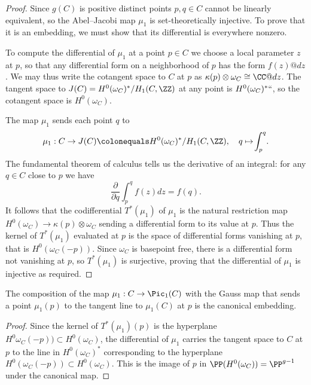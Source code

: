 \begin{proof}
Since $g(C)$
is positive
distinct points $p, q \in C$ cannot be linearly equivalent, so the
Abel--Jacobi map $\mu_1$ is set-theoretically
injective. To prove that it is an embedding, we must show
that its differential is
everywhere nonzero.

To compute the differential of $\mu_1$ at a point $p\in C$ we choose a
local parameter $z$ at $p$, so that any differential form on a
neighborhood of $p$ has the form $f(z)@dz$. We may thus write the
cotangent space to $C$ at $p$ as
$\kappa(p) \otimes \omega_{C} \cong \CC@dz$. The tangent space to
$J(C) = H^0(\omega_C)^*/H_1(C, \ZZ)$ at any point is
$H^0(\omega_C)^*` `$, so the
%
cotangent space
is $H^0(\omega_C)$.

The map $\mu_{1}$ sends each point $q$ to
\vspace*{-2pt}
$$
\mu_1 : C \to J(C) \colonequals H^0(\omega_C)^*/H_1(C, \ZZ),
\quad q \mapsto \!\int_p^q \!.
\vspace*{-2pt}
$$
The
%
fundamental theorem of calculus
tells us the derivative of an integral:
for any $q\in C$ close to $p$ we have
$$
\frac{\partial}{\partial q} \int_p^q \!f(z)dz = f(q).
$$
It follows that
the
%
codifferential
$T^*(\mu_1)$ of $\mu_1$ is the natural restriction map $H^0(\omega_{C}) \to \kappa(p) \otimes \omega_{C}$ sending
a differential form to its value at $p$. Thus the kernel of $T^*(\mu_1)$ evaluated at $p$ is the space of differential forms vanishing
at $p$, that is
$H^{0}(\omega_{C}(-p))$. Since $\omega_{C}$ is basepoint free, there is a differential form not vanishing at $p$,
so  $T^*(\mu_1)$ is surjective, proving that
the differential of $\mu_{1}$ is injective as required.
\end{proof}

\begin{corollary}
The composition of the map $\mu_{1}: C \to \Pic_{1}(C)$ with the
Gauss map
%
that sends a point $\mu_{1}(p)$
to the tangent line to $\mu_{1}(C)$ at $p$ is the
canonical embedding.
%
\unif
\end{corollary}

\begin{proof}
Since
the kernel of $T^*(\mu_1)(p)$ is  the hyperplane $H^{0}\omega_{C}(-p))\subset H^{0}(\omega_{C})$, the differential
of $\mu_{1}$ carries the tangent space to $C$ at $p$ to the line
in $H^0(\omega_C)^*$ corresponding to the hyperplane $H^0(\omega_C(-p))\subset H^0(\omega_C)$.
This is the image of $p$ in $\PP(H^{0}(\omega_{C})) = \PP^{g-1}$ under the
canonical map.
\end{proof}


